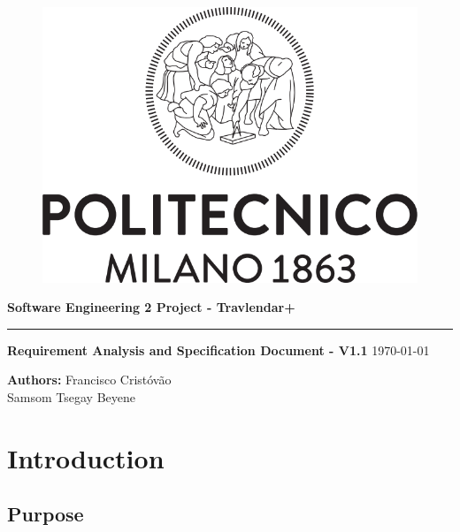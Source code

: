 \documentclass[12pt]{article}
\begin{document}
\begin{titlepage}
    \begin{center}
    \begin{figure}
        \centering
        \includegraphics[scale=0.2]{logoPolimi.png}
        \vspace{1.5cm}
    \end{figure}

    \Huge\textbf{Software Engineering 2 Project - Travlendar+}
    \rule{12cm}{0.5pt}
    \Huge\textbf{Requirement Analysis and Specification Document - V1.1}
    \today
    \end{center}
    
    \vspace{3cm}
    
    \begin{flushleft}
        \LARGE\textbf{Authors: }
        \newline\newline
        \Large\texttt{}{Francisco Cristóvão \\ Samsom Tsegay Beyene}
    \end{flushleft}



\end{titlepage}

\newpage
  \tableofcontents
\newpage

\section{Introduction}

\subsection{Purpose}
\end{document}
